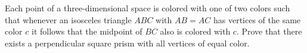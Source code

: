 \begin{problem}
    Each point of a three-dimensional space is colored
    with one of two colors such that
    whenever an isosceles triangle $ABC$ with $AB = AC$
    has vertices of the same color $c$ it follows that
    the midpoint of $BC$ also is colored with $c$.
    Prove that there exists a perpendicular square prism
    with all vertices of equal color.

    \label{TWCH0721}
\end{problem}